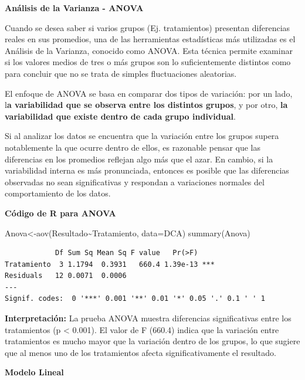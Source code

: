 \documentclass[
  spanish,
  letterpaper,
  DIV=11,
  numbers=noendperiod]{scrreprt}
\newenvironment{Shaded}{\begin{snugshade}}{\end{snugshade}}
\newcommand{\AttributeTok}[1]{\textcolor[rgb]{0.40,0.45,0.13}{#1}}
\newcommand{\FunctionTok}[1]{\textcolor[rgb]{0.28,0.35,0.67}{#1}}
\newcommand{\NormalTok}[1]{\textcolor[rgb]{0.00,0.23,0.31}{#1}}
\newcommand{\OtherTok}[1]{\textcolor[rgb]{0.00,0.23,0.31}{#1}}
\newcommand{\SpecialCharTok}[1]{\textcolor[rgb]{0.37,0.37,0.37}{#1}}
\begin{document}
\textbf{Análisis de la Varianza - ANOVA}

Cuando se desea saber si varios grupos (Ej. tratamientos) presentan
diferencias reales en sus promedios, una de las herramientas
estadísticas más utilizadas es el Análisis de la Varianza, conocido como
ANOVA. Esta técnica permite examinar si los valores medios de tres o más
grupos son lo suficientemente distintos como para concluir que no se
trata de simples fluctuaciones aleatorias.

El enfoque de ANOVA se basa en comparar dos tipos de variación: por un
lado, l\textbf{a variabilidad que se observa entre los distintos
grupos}, y por otro, \textbf{la variabilidad que existe dentro de cada
grupo individual}.

Si al analizar los datos se encuentra que la variación entre los grupos
supera notablemente la que ocurre dentro de ellos, es razonable pensar
que las diferencias en los promedios reflejan algo más que el azar. En
cambio, si la variabilidad interna es más pronunciada, entonces es
posible que las diferencias observadas no sean significativas y
respondan a variaciones normales del comportamiento de los datos.

\textbf{Código de R para ANOVA}

\begin{Shaded}
\begin{Highlighting}[]
\NormalTok{Anova}\OtherTok{\textless{}{-}}\FunctionTok{aov}\NormalTok{(Resultado}\SpecialCharTok{\textasciitilde{}}\NormalTok{Tratamiento, }\AttributeTok{data=}\NormalTok{DCA)}
\FunctionTok{summary}\NormalTok{(Anova)}
\end{Highlighting}
\end{Shaded}

\begin{verbatim}
            Df Sum Sq Mean Sq F value   Pr(>F)    
Tratamiento  3 1.1794  0.3931   660.4 1.39e-13 ***
Residuals   12 0.0071  0.0006                     
---
Signif. codes:  0 '***' 0.001 '**' 0.01 '*' 0.05 '.' 0.1 ' ' 1
\end{verbatim}

\textbf{Interpretación:} La prueba ANOVA muestra diferencias
significativas entre los tratamientos (p \textless{} 0.001). El valor de
F (660.4) indica que la variación entre tratamientos es mucho mayor que
la variación dentro de los grupos, lo que sugiere que al menos uno de
los tratamientos afecta significativamente el resultado.

\textbf{Modelo Lineal}
\end{document}

